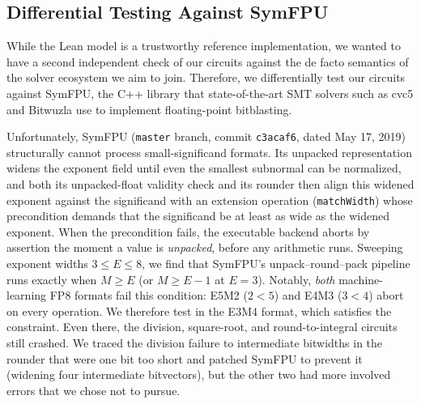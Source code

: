 
\subsection{Differential Testing Against SymFPU}

While the Lean model is a trustworthy reference implementation,
we wanted to have a second independent check of our circuits against the de facto semantics of the solver ecosystem we aim to join.
Therefore, we differentially test our circuits against SymFPU,
the C++ library that state-of-the-art SMT solvers such as cvc5 and Bitwuzla use to implement floating-point bitblasting.

Unfortunately, SymFPU (\texttt{master} branch, commit \texttt{c3acaf6}, dated May 17, 2019) structurally
cannot process small-significand formats.
Its unpacked representation widens the exponent field until even the smallest
subnormal can be normalized, and both its unpacked-float validity check and its
rounder then align this widened exponent against the significand with an
extension operation (\texttt{matchWidth}) whose precondition demands that the
significand be at least as wide as the widened exponent.
When the precondition fails, the executable backend aborts by assertion the
moment a value is \emph{unpacked}, before any arithmetic runs.
Sweeping exponent widths $3 \le E \le 8$, we find that SymFPU's
unpack--round--pack pipeline runs exactly when $M \ge E$
(or $M \ge E - 1$ at $E = 3$).
Notably, \emph{both} machine-learning FP8 formats fail this condition:
E5M2 ($2 < 5$) and E4M3 ($3 < 4$) abort on every operation.
We therefore test in the E3M4 format, which satisfies the constraint.
Even there, the division, square-root,
and round-to-integral circuits still crashed. We traced the division failure to intermediate
bitwidths in the rounder that were one bit too short and patched SymFPU to prevent it
(widening four intermediate bitvectors), but the other two had
more involved errors that we chose not to pursue.

